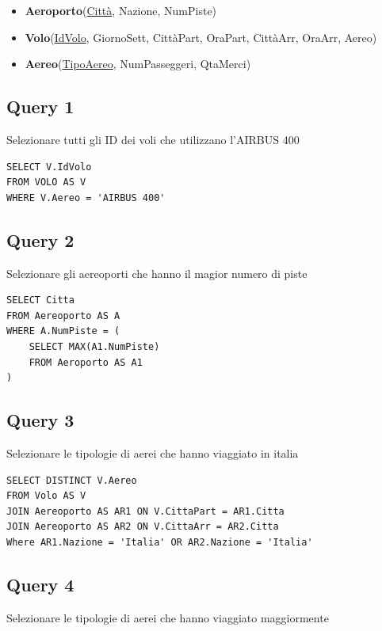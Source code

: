 \begin{itemize}
    \item \textbf{Aeroporto}(\underline{Città}, Nazione, NumPiste)
    \item \textbf{Volo}(\underline{IdVolo}, GiornoSett, CittàPart, OraPart, CittàArr, OraArr, Aereo) 
    \item \textbf{Aereo}(\underline{TipoAereo}, NumPasseggeri, QtaMerci)
\end{itemize}

\subsection{Query 1}
Selezionare tutti gli ID dei voli che utilizzano l'AIRBUS 400

\begin{lstlisting}
SELECT V.IdVolo
FROM VOLO AS V
WHERE V.Aereo = 'AIRBUS 400'
\end{lstlisting}

\subsection{Query 2}
Selezionare gli aereoporti che hanno il magior numero di piste
\begin{lstlisting}
SELECT Citta
FROM Aereoporto AS A
WHERE A.NumPiste = (
    SELECT MAX(A1.NumPiste)
    FROM Aeroporto AS A1
)
\end{lstlisting}

\subsection{Query 3}
Selezionare le tipologie di aerei che hanno viaggiato in italia

\begin{lstlisting}
SELECT DISTINCT V.Aereo
FROM Volo AS V
JOIN Aereoporto AS AR1 ON V.CittaPart = AR1.Citta 
JOIN Aereoporto AS AR2 ON V.CittaArr = AR2.Citta
Where AR1.Nazione = 'Italia' OR AR2.Nazione = 'Italia'
\end{lstlisting}

\subsection{Query 4}
Selezionare le tipologie di aerei che hanno viaggiato maggiormente
\begin{lstlisting}
    
\end{lstlisting}

